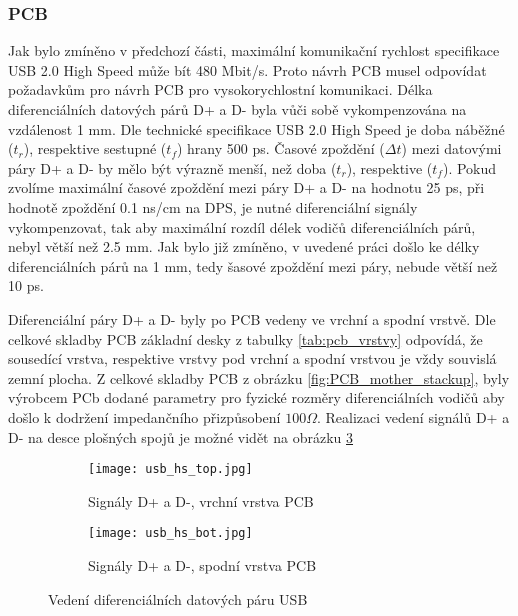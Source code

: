 	\subsubsection{PCB}
	Jak bylo zmíněno v předchozí části, maximální komunikační rychlost specifikace USB 2.0 High Speed může bít 480 Mbit/s. Proto návrh PCB musel odpovídat požadavkům pro návrh PCB pro vysokorychlostní komunikaci. Délka diferenciálních datových párů D+ a D- byla vůči sobě vykompenzována na vzdálenost 1 mm. Dle technické specifikace USB 2.0 High Speed je doba náběžné ($t_r$), respektive sestupné ($t_f$) hrany 500 ps. Časové zpoždění ($\Delta t$) mezi datovými páry D+ a D- by mělo být výrazně menší, než doba ($t_r$), respektive ($t_f$). Pokud zvolíme maximální časové zpoždění mezi páry D+ a D- na hodnotu 25 ps, při hodnotě zpoždění 0.1 ns/cm na DPS, je nutné diferenciální signály vykompenzovat, tak aby maximální rozdíl délek vodičů diferenciálních párů, nebyl větší než 2.5 mm. Jak bylo již zmíněno, v uvedené práci došlo ke délky diferenciálních párů na 1 mm, tedy šasové zpoždění mezi páry, nebude větší než 10 ps.
	\par Diferenciální páry D+ a D- byly po PCB vedeny ve vrchní a spodní vrstvě. Dle celkové skladby PCB základní desky z tabulky \ref{tab:pcb_vrstvy} odpovídá, že sousedící vrstva, respektive vrstvy pod vrchní a spodní vrstvou je vždy souvislá zemní plocha. Z celkové skladby PCB z obrázku \ref{fig:PCB_mother_stackup}, byly výrobcem PCb dodané parametry pro fyzické rozměry diferenciálních vodičů aby došlo k dodržení impedančního přizpůsobení $100 \Omega$. Realizaci vedení signálů D+ a D- na desce plošných spojů je možné vidět na obrázku \ref{fig:usb_layout}
	
	\begin{figure}[h!]
		\begin{subfigure}{0.5\textwidth}
			\centering
			\captionsetup{justification=centering}
			\texttt{[image: usb\_hs\_top.jpg]}
			\caption{Signály D+ a D-, vrchní vrstva PCB} 
			\label{fig:usb_top}
		\end{subfigure} \hfill
		\begin{subfigure}{0.5\textwidth}
			\centering
			\captionsetup{justification=centering}
			\texttt{[image: usb\_hs\_bot.jpg]}
			\caption{Signály D+ a D-, spodní vrstva PCB} 
			\label{fig:usb_bot}
		\end{subfigure}
		\caption{Vedení diferenciálních datových páru USB}
		\label{fig:usb_layout}
	\end{figure} 
